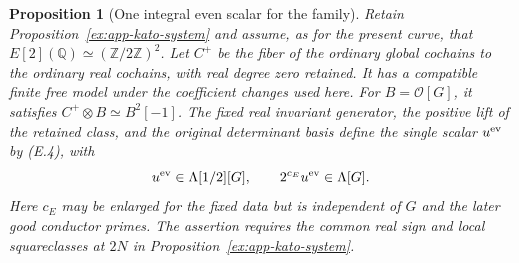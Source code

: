 \documentclass[11pt]{article}
\newtheorem{proposition}[theorem]{Proposition}
\theoremstyle{definition}
\theoremstyle{remark}
\newcommand{\Q}{\mathbb Q}
\newcommand{\Z}{\mathbb Z}
\providecommand{\mathscr}[1]{\mathcal{#1}}
\begin{document}
\begin{proposition}[One integral even scalar for the family]\label{ex:app-even-scalar}
Retain Proposition~\ref{ex:app-kato-system} and assume, as for the
present curve, that $E[2](\Q)\simeq(\Z/2\Z)^2$. Let $C^+$ be the
fiber of the ordinary global cochains to the ordinary real cochains,
with real degree zero retained. It has a compatible finite free model
under the coefficient changes used here. For
$B=\mathscr O[G]$, it satisfies $C^+\otimes B\simeq B^2[-1]$.
The fixed real invariant generator, the positive lift of the retained
class, and the original determinant basis define the single scalar
$u^{\rm ev}$ by (E.4), with
\[
 u^{\rm ev}\in\Lambda[1/2][G],\qquad
 2^{c_E}u^{\rm ev}\in\Lambda[G].
\]
Here $c_E$ may be enlarged for the fixed data but is independent of
$G$ and the later good conductor primes. The assertion requires the
common real sign and local squareclasses at $2N$ in
Proposition~\ref{ex:app-kato-system}.
\end{proposition}
\end{document}
